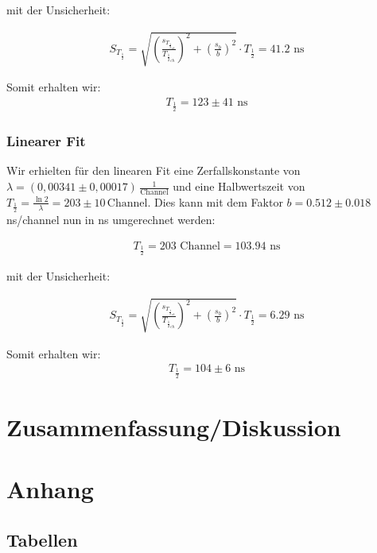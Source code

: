 \documentclass[12pt]{article}
\begin{document}
mit der Unsicherheit:

\begin{align*}
S_{T_{\frac12}} = \sqrt{\left(\frac{s_{T_{{\frac12}_{ch}}}}{T_{{\frac12}_{ch}}}\right)^2+\left(\frac{s_b}{b}\right)^2} \cdot T_{\frac12} = 41.2 \text{ ns}
\end{align*}

Somit erhalten wir:
\begin{align*}
T_{\frac12} = 123 \pm 41 \text{ ns}
\end{align*}

\subsubsection{Linearer Fit}

Wir erhielten für den linearen Fit eine Zerfallskonstante von  $\lambda=(0,00341\pm0,00017)\, \frac1{\text{Channel}}$ und eine Halbwertszeit von $T_{\frac12}=\frac{\ln2}{\lambda}=203\pm10\,\text{Channel}$. Dies kann mit dem Faktor $b=0.512\pm0.018$ ns/channel nun in ns umgerechnet werden:

\begin{align*}
T_{\frac12} = 203\text{ Channel} = 103.94 \text{ ns}
\end{align*}

mit der Unsicherheit:

\begin{align*}
S_{T_{\frac12}} = \sqrt{\left(\frac{s_{T_{{\frac12}_{ch}}}}{T_{{\frac12}_{ch}}}\right)^2+\left(\frac{s_b}{b}\right)^2} \cdot T_{\frac12} = 6.29 \text{ ns}
\end{align*}

Somit erhalten wir:
\begin{align*}
T_{\frac12} = 104 \pm 6 \text{ ns}
\end{align*}

\section{Zusammenfassung/Diskussion}


\newpage
\section{Anhang}

\subsection{Tabellen}

%
\end{document}
